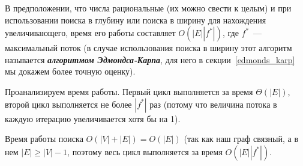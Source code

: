 \begin{comment}
\draw (195,107.4) node [anchor=north west][inner sep=0.75pt]    {$v_{1}$};
\draw (366,28.4) node [anchor=north west][inner sep=0.75pt]    {$s$};
\draw (367,177.4) node [anchor=north west][inner sep=0.75pt]    {$t$};
\draw (303,105.4) node [anchor=north west][inner sep=0.75pt]    {$v_{2}$};
\draw (413,104.4) node [anchor=north west][inner sep=0.75pt]    {$v_{3}$};
\draw (518,104.4) node [anchor=north west][inner sep=0.75pt]    {$v_{4}$};
\draw (333,59.4) node [anchor=north west][inner sep=0.75pt]    {$3$};
\draw (264,45.4) node [anchor=north west][inner sep=0.75pt]    {$3$};
\draw (462,45.4) node [anchor=north west][inner sep=0.75pt]    {$3$};
\draw (254,93.4) node [anchor=north west][inner sep=0.75pt]    {$1$};
\draw (359,92.4) node [anchor=north west][inner sep=0.75pt]    {$1$};
\draw (454,145.4) node [anchor=north west][inner sep=0.75pt]    {$3$};
\draw (378,132.4) node [anchor=north west][inner sep=0.75pt]    {$3$};
\draw (266,163.4) node [anchor=north west][inner sep=0.75pt]    {$3$};
\draw (445,88.4) node [anchor=north west][inner sep=0.75pt]    {$c=\frac{\sqrt{5} -1}{2}$};
\end{tikzpicture}
\end{center}

Величина максимального потока в этой сети равна $7=2\cdot3+1$ (на ребрах $s\to v_1\to t$ и $s\to v_4\to t$ его значение 3, на ребрах $s\to v_2\to v_3\to t$ его значение 1).
\end{example}
\end{comment}

В предположении, что числа рациональные (их можно свести к целым) и при использовании поиска в глубину или поиска в ширину для нахождения увеличивающего, время его работы составляет $O(|E||f^*|)$, где $f^*$~--- максимальный поток (в случае использования поиска в ширину этот алгоритм называется {\bf\it алгоритмом Эдмондса-Карпа}, для него в секции~\ref{edmonds_karp} мы докажем более точную оценку).

Проанализируем время работы. Первый цикл выполняется за время $\Theta(|E|)$, второй цикл выполняется не более $|f^*|$ раз (потому что величина потока в каждую итерацию увеличивается хотя бы на 1).

Время работы поиска $O(|V|+|E|)=O(|E|)$ (так как наш граф связный, а в нем $|E|\ge |V|-1$, поэтому весь цикл выполняется за время $O(|E||f^*|)$.

